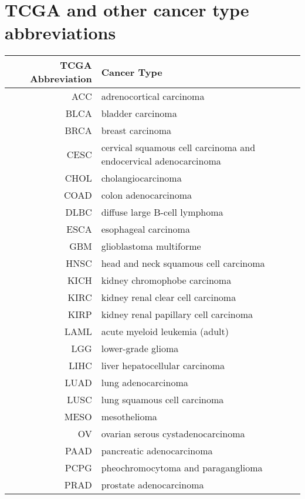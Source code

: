\chapter{TCGA and other cancer type abbreviations}
\label{app.cancerabbrev}

\begin{table}[H]
    \begin{center}
        \small
        \begin{tabular}{r|l}
            \textbf{TCGA Abbreviation} & \textbf{Cancer Type} \\
            \hline
            ACC & adrenocortical carcinoma \\
            BLCA & bladder carcinoma \\
            BRCA & breast carcinoma \\
            CESC & cervical squamous cell carcinoma and endocervical adenocarcinoma \\
            CHOL & cholangiocarcinoma \\
            COAD & colon adenocarcinoma \\
            DLBC & diffuse large B-cell lymphoma \\
            ESCA & esophageal carcinoma \\
            GBM & glioblastoma multiforme \\
            HNSC & head and neck squamous cell carcinoma \\
            KICH & kidney chromophobe carcinoma \\
            KIRC & kidney renal clear cell carcinoma \\
            KIRP & kidney renal papillary cell carcinoma \\
            LAML & acute myeloid leukemia (adult) \\
            LGG & lower-grade glioma \\
            LIHC & liver hepatocellular carcinoma \\
            LUAD & lung adenocarcinoma \\
            LUSC & lung squamous cell carcinoma \\
            MESO & mesothelioma \\
            OV & ovarian serous cystadenocarcinoma \\
            PAAD & pancreatic adenocarcinoma \\
            PCPG & pheochromocytoma and paraganglioma \\
            PRAD & prostate adenocarcinoma \\

\end{tabular}
\end{center}
\end{table}

